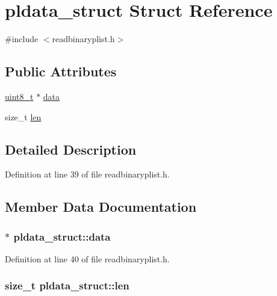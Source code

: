 \hypertarget{structpldata__struct}{}\section{pldata\+\_\+struct Struct Reference}
\label{structpldata__struct}


{\ttfamily \#include $<$readbinaryplist.\+h$>$}

\subsection*{Public Attributes}
\begin{DoxyCompactItemize}
\item 
\hyperlink{lib-src_2ffmpeg_2win32_2stdint_8h_a9a941819355e6f658991890ff66b4b0e}{uint8\+\_\+t} $\ast$ \hyperlink{structpldata__struct_aa49e9df08964fc653b2f80080f348d90}{data}
\item 
size\+\_\+t \hyperlink{structpldata__struct_a4ac29c88cd0fa2e309e4b75fdbeffbc5}{len}
\end{DoxyCompactItemize}


\subsection{Detailed Description}


Definition at line 39 of file readbinaryplist.\+h.



\subsection{Member Data Documentation}
\subsubsection[{\texorpdfstring{data}{data}}]{$\ast$ pldata\+\_\+struct\+::data}\hypertarget{structpldata__struct_aa49e9df08964fc653b2f80080f348d90}{}\label{structpldata__struct_aa49e9df08964fc653b2f80080f348d90}


Definition at line 40 of file readbinaryplist.\+h.

\subsubsection[{\texorpdfstring{len}{len}}]{\setlength{\rightskip}{0pt plus 5cm}size\+\_\+t pldata\+\_\+struct\+::len}\hypertarget{structpldata__struct_a4ac29c88cd0fa2e309e4b75fdbeffbc5}{}\label{structpldata__struct_a4ac29c88cd0fa2e309e4b75fdbeffbc5}


